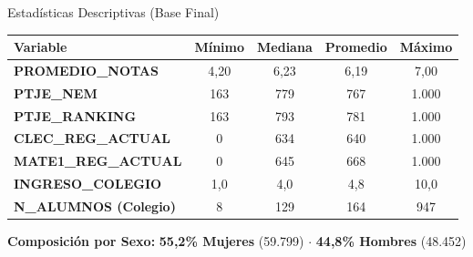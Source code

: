 \documentclass[10pt, aspectratio=169, xcolor=table]{beamer}
\begin{document}
\begin{frame}{Estadísticas Descriptivas (Base Final)}
  \begin{table}
    \centering
    \scriptsize
    \begin{tabular}{lcccc}
      \toprule
      \textbf{\textcolor{USACHNavy}{Variable}} & \textbf{\textcolor{USACHNavy}{Mínimo}} & \textbf{\textcolor{USACHNavy}{Mediana}} & \textbf{\textcolor{USACHNavy}{Promedio}} & \textbf{\textcolor{USACHNavy}{Máximo}} \\
      \midrule
      \textbf{PROMEDIO\_NOTAS} & 4,20 & 6,23 & 6,19 & 7,00 \\
      \textbf{PTJE\_NEM} & 163 & 779 & 767 & 1.000 \\
      \textbf{PTJE\_RANKING} & 163 & 793 & 781 & 1.000 \\
      \textbf{CLEC\_REG\_ACTUAL} & 0 & 634 & 640 & 1.000 \\
      \textbf{MATE1\_REG\_ACTUAL} & 0 & 645 & 668 & 1.000 \\
      \textbf{INGRESO\_COLEGIO} & 1,0 & 4,0 & 4,8 & 10,0 \\
      \textbf{N\_ALUMNOS (Colegio)} & 8 & 129 & 164 & 947 \\
      \bottomrule
    \end{tabular}
  \end{table}

  \vspace{0.1cm}
  \begin{center}
    \footnotesize
    \textbf{Composición por Sexo:} \textcolor{USACHTeal}{\textbf{55,2\% Mujeres}} (59.799) $\cdot$ \textcolor{USACHNavy}{\textbf{44,8\% Hombres}} (48.452)
  \end{center}
\end{frame}
\end{document}
